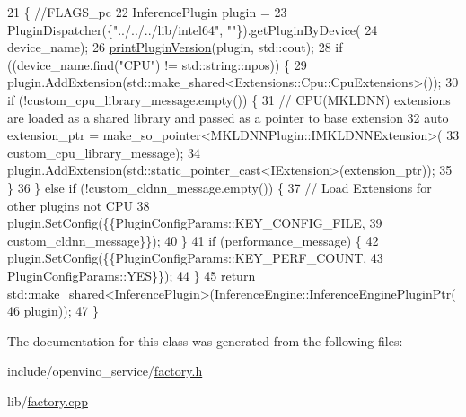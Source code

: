 \begin{DoxyCode}
21                                                                                      \{ \textcolor{comment}{//FLAGS\_pc}
22   InferencePlugin plugin =
23       PluginDispatcher(\{\textcolor{stringliteral}{"../../../lib/intel64"}, \textcolor{stringliteral}{""}\}).getPluginByDevice(
24           device\_name);
26   \hyperlink{common_8hpp_a8298b0a3bbb92311d94560e64ecfc0f1}{printPluginVersion}(plugin, std::cout);
28   \textcolor{keywordflow}{if} ((device\_name.find(\textcolor{stringliteral}{"CPU"}) != std::string::npos)) \{
29     plugin.AddExtension(std::make\_shared<Extensions::Cpu::CpuExtensions>());
30     \textcolor{keywordflow}{if} (!custom\_cpu\_library\_message.empty()) \{
31       \textcolor{comment}{// CPU(MKLDNN) extensions are loaded as a shared library and passed as a pointer to base extension}
32       \textcolor{keyword}{auto} extension\_ptr = make\_so\_pointer<MKLDNNPlugin::IMKLDNNExtension>(
33           custom\_cpu\_library\_message);
34       plugin.AddExtension(std::static\_pointer\_cast<IExtension>(extension\_ptr));
35     \}
36   \} \textcolor{keywordflow}{else} \textcolor{keywordflow}{if} (!custom\_cldnn\_message.empty()) \{
37     \textcolor{comment}{// Load Extensions for other plugins not CPU}
38     plugin.SetConfig(\{\{PluginConfigParams::KEY\_CONFIG\_FILE,
39                        custom\_cldnn\_message\}\});
40   \}
41   \textcolor{keywordflow}{if} (performance\_message) \{
42     plugin.SetConfig(\{\{PluginConfigParams::KEY\_PERF\_COUNT,
43                        PluginConfigParams::YES\}\});
44   \}
45   \textcolor{keywordflow}{return} std::make\_shared<InferencePlugin>(InferenceEngine::InferenceEnginePluginPtr(
46       plugin));
47 \}\end{DoxyCode}


The documentation for this class was generated from the following files\+:\begin{DoxyCompactItemize}
\item 
include/openvino\+\_\+service/\hyperlink{factory_8h}{factory.\+h}\item 
lib/\hyperlink{factory_8cpp}{factory.\+cpp}\end{DoxyCompactItemize}
